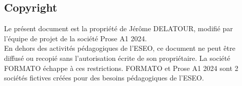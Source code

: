 \subsection{Copyright}

Le présent document est la propriété de Jérôme DELATOUR, modifié par l'équipe de projet de la société Prose A1 2024.
\\
En dehors des activités pédagogiques de l'ESEO, ce document ne peut être diffusé ou recopié sans l'autorisation écrite de son propriétaire. 
La société FORMATO échappe à ces restrictions.
FORMATO et Prose A1 2024 sont 2 sociétés fictives créées pour des besoins pédagogiques de l'ESEO.